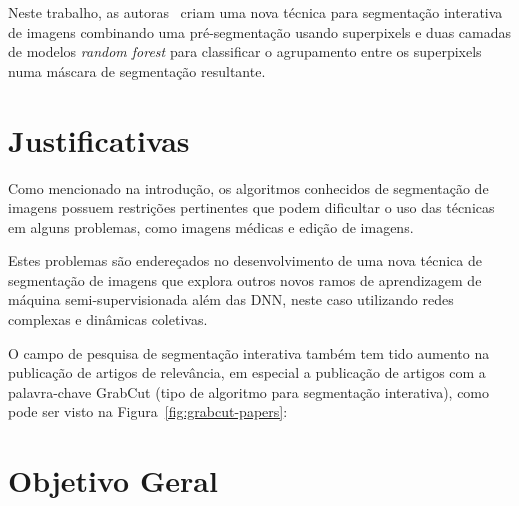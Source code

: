 Neste trabalho, as autoras~\cite{shan2023interactive} criam uma nova
técnica para segmentação interativa de imagens combinando uma
pré-segmentação usando superpixels e duas camadas de modelos
\textit{random forest} para classificar o agrupamento entre os
superpixels numa máscara de segmentação resultante.


\section{Justificativas}\label{sec:justificativas}

Como mencionado na introdução, os algoritmos conhecidos de segmentação
de imagens possuem restrições pertinentes que podem dificultar o uso
das técnicas em alguns problemas, como imagens médicas e edição de
imagens.

Estes problemas são endereçados no desenvolvimento de uma nova técnica
de segmentação de imagens que explora outros novos ramos de
aprendizagem de máquina semi-supervisionada além das \gls{DNN}, neste
caso utilizando redes complexas e dinâmicas coletivas.

O campo de pesquisa de segmentação interativa também tem tido aumento
na publicação de artigos de relevância, em especial a publicação de
artigos com a palavra-chave GrabCut (tipo de algoritmo para
segmentação interativa), como pode ser visto na
Figura~\ref{fig:grabcut-papers}:

\begin{figure}[!h]
        \captionsetup{width=12cm}
		\centering
\end{figure}



\section{Objetivo Geral}\label{sec:objetivo-geral}

